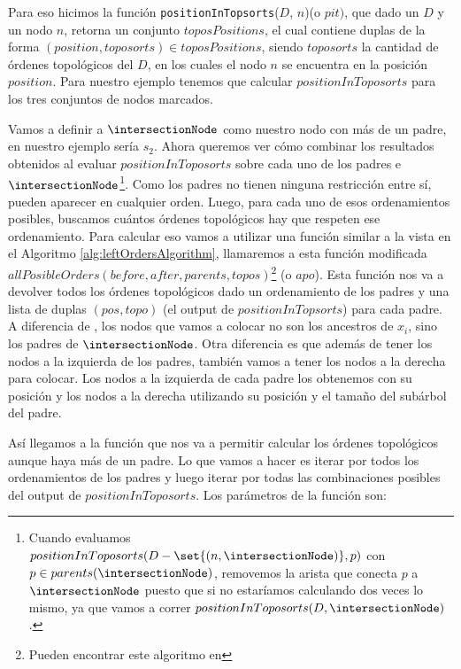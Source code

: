 Para eso hicimos la función \texttt{positionInTopsorts}($D$, $n$)(o $pit)$, que dado un \dtree{} $D$ y un nodo $n$, retorna un conjunto $toposPositions$, el cual contiene duplas de la forma $(position, toposorts) \in toposPositions$, siendo $toposorts$ la cantidad de órdenes topológicos del \dtree{} $D$, en los cuales el nodo $n$ se encuentra en la posición $position$. Para nuestro ejemplo tenemos que calcular $positionInToposorts$ para los tres conjuntos de nodos marcados.

Vamos a definir a $\intersectionNode$ como nuestro nodo con más de un padre, en nuestro ejemplo sería $s_2$. Ahora queremos ver cómo combinar los resultados obtenidos al evaluar $positionInToposorts$ sobre cada uno de los padres e $\intersectionNode$\footnote{Cuando evaluamos $positionInToposorts(D-\set{(n,\intersectionNode)},p)$ con $p \in parents(\intersectionNode)$, removemos la arista que conecta $p$ a $\intersectionNode$ puesto que si no estaríamos calculando dos veces lo mismo, ya que vamos a correr $positionInToposorts(D,\intersectionNode)$.}. Como los padres no tienen ninguna restricción entre sí, pueden aparecer en cualquier orden. Luego, para cada uno de esos ordenamientos posibles, buscamos cuántos órdenes topológicos hay que respeten ese ordenamiento. Para calcular eso vamos a utilizar una función similar a la vista en el Algoritmo \ref{alg:leftOrdersAlgorithm}, llamaremos a esta función modificada $allPosibleOrders(before,after,parents, topos)$\footnote{Pueden encontrar este algoritmo en } (o $apo$). Esta función nos va a devolver todos los órdenes topológicos dado un ordenamiento de los padres y una lista de duplas $(pos,topo)$ (el output de $positionInTopsorts$) para cada padre. A diferencia de \leftPossibleOrders, los nodos que vamos a colocar no son los ancestros de $x_i$, sino los padres de $\intersectionNode$. Otra diferencia es que además de tener los nodos a la izquierda de los padres, también vamos a tener los nodos a la derecha para colocar. Los nodos a la izquierda de cada padre los obtenemos con su posición y los nodos a la derecha utilizando su posición y el tamaño del subárbol del padre.


Así llegamos a la función que nos va a permitir calcular los órdenes topológicos aunque haya más de un padre. Lo que vamos a hacer es iterar por todos los ordenamientos de los padres y luego iterar por todas las combinaciones posibles del output de $positionInToposorts$. Los parámetros de la función son:

